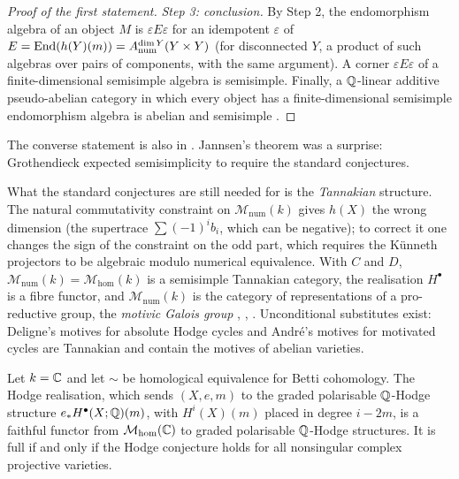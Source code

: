\begin{proof}[Proof of the first statement]
\emph{Step 3: conclusion.} By Step 2, the endomorphism algebra of an object $M$ is $\varepsilon E\varepsilon$ for an idempotent $\varepsilon$ of $E = \operatorname{End}(h(Y)(m)) = A^{\dim Y}_{\mathrm{num}}(Y \times Y)$ (for disconnected $Y$,
a product of such algebras over pairs of components, with the same argument). A corner $\varepsilon E\varepsilon$ of a finite-dimensional semisimple algebra is semisimple. Finally, a $\mathbb{Q}$-linear additive pseudo-abelian
category in which every object has a finite-dimensional semisimple endomorphism algebra is abelian and semisimple \cite{jannsen-1992}.
\end{proof}

The converse statement is also in \cite{jannsen-1992}. Jannsen's theorem was a surprise: Grothendieck expected semisimplicity to require the standard conjectures.

\begin{remark}\label{standard-conjectures:remark-tannakian}
What the standard conjectures are still needed for is the \emph{Tannakian} structure. The natural commutativity constraint on $\mathcal{M}_{\mathrm{num}}(k)$ gives $h(X)$ the wrong dimension (the
supertrace $\sum(-1)^ib_i$, which can be negative); to correct it one changes the sign of the constraint on the odd part, which requires the K\"unneth projectors to be algebraic modulo numerical
equivalence. With $C$ and $D$, $\mathcal{M}_{\mathrm{num}}(k) = \mathcal{M}_{\mathrm{hom}}(k)$ is a semisimple Tannakian category, the realisation $H^\bullet$ is a fibre functor, and $\mathcal{M}_{\mathrm{num}}(k)$ is the category of
representations of a pro-reductive group, the \emph{motivic Galois group} \cite{jannsen-1992}, \cite{andre-motifs}, \cite{deligne-milne}. Unconditional substitutes exist: Deligne's motives for absolute Hodge
cycles \cite{deligne-milne} and Andr\'e's motives for motivated cycles \cite{andre-1996-motifs} are Tannakian and contain the motives of abelian varieties.
\end{remark}

\begin{proposition}\label{standard-conjectures:proposition-motivic-hodge}
Let $k = \mathbb{C}$ and let $\sim$ be homological equivalence for Betti cohomology. The Hodge realisation, which sends $(X, e, m)$ to the graded polarisable $\mathbb{Q}$-Hodge structure $e_*H^\bullet(X; \mathbb{Q})(m)$, with
$H^i(X)(m)$ placed in degree $i - 2m$, is a faithful functor from $\mathcal{M}_{\mathrm{hom}}(\mathbb{C})$ to graded polarisable $\mathbb{Q}$-Hodge structures. It is full if and only if the Hodge conjecture holds for all
nonsingular complex projective varieties.
\end{proposition}

